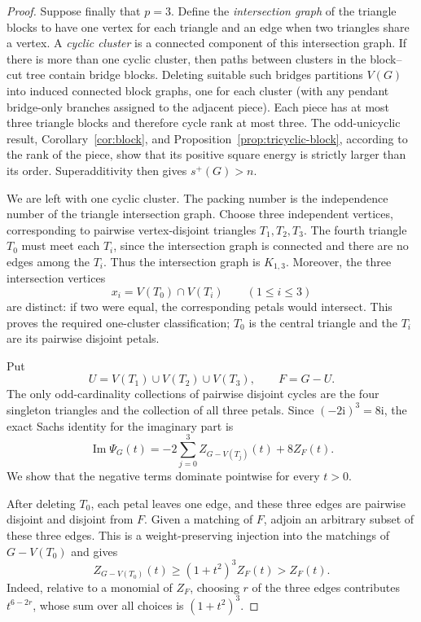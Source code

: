 \documentclass[11pt]{article}
\theoremstyle{definition}
\theoremstyle{remark}
\newcommand{\ii}{\mathrm{i}}
\begin{document}
\begin{proof}
Suppose finally that $p=3$.  Define the \emph{intersection graph} of the
triangle blocks to have one vertex for each triangle and an edge when two
triangles share a vertex.  A \emph{cyclic cluster} is a connected component
of this intersection graph.  If there is more than one cyclic cluster,
then paths between clusters in the block--cut tree contain bridge blocks.
Deleting suitable such bridges partitions $V(G)$ into induced connected
block graphs, one for each cluster (with any pendant bridge-only branches
assigned to the adjacent piece).  Each piece has at most three triangle
blocks and therefore cycle rank at most three.  The odd-unicyclic result,
Corollary~\ref{cor:block}, and
Proposition~\ref{prop:tricyclic-block}, according to the rank of the piece,
show that its positive square energy is strictly larger than its order.
Superadditivity then gives $s^+(G)>n$.

We are left with one cyclic cluster.  The packing number is the independence
number of the triangle intersection graph.  Choose three independent
vertices, corresponding to pairwise vertex-disjoint triangles
$T_1,T_2,T_3$.  The fourth triangle $T_0$ must meet each $T_i$, since the
intersection graph is connected and there are no edges among the $T_i$.
Thus the intersection graph is $K_{1,3}$.  Moreover, the three intersection
vertices
\[
 x_i=V(T_0)\cap V(T_i)\qquad(1\le i\le3)
\]
are distinct: if two were equal, the corresponding petals would intersect.
This proves the required one-cluster classification; $T_0$ is the central
triangle and the $T_i$ are its pairwise disjoint petals.

Put
\[
 U=V(T_1)\cup V(T_2)\cup V(T_3),\qquad F=G-U.
\]
The only odd-cardinality collections of pairwise disjoint cycles are the
four singleton triangles and the collection of all three petals.  Since
$(-2\ii)^3=8\ii$, the exact Sachs identity for the imaginary part is
\begin{equation}\label{eq:tetracyclic-imaginary}
 \operatorname{Im}\Psi_G(t)
 =-2\sum_{j=0}^3Z_{G-V(T_j)}(t)+8Z_F(t).
\end{equation}
We show that the negative terms dominate pointwise for every $t>0$.

After deleting $T_0$, each petal leaves one edge, and these three edges are
pairwise disjoint and disjoint from $F$.  Given a matching of $F$, adjoin
an arbitrary subset of these three edges.  This is a weight-preserving
injection into the matchings of $G-V(T_0)$ and gives
\begin{equation}\label{eq:central-deletion-bound}
 Z_{G-V(T_0)}(t)\ge(1+t^2)^3Z_F(t)>Z_F(t).
\end{equation}
Indeed, relative to a monomial of $Z_F$, choosing $r$ of the three edges
contributes $t^{6-2r}$, whose sum over all choices is $(1+t^2)^3$.


\end{proof}
\end{document}
